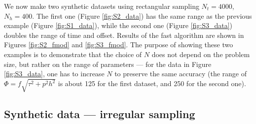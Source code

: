 We now make two synthetic datasets using rectangular sampling $N_t=4000$, $N_h=400$. The first one (Figure \ref{fig:S2_data}) has the same range as the previous example (Figure \ref{fig:S1_data}), while the second one (Figure \ref{fig:S3_data}) doubles the range of time and offset. Results of the fast algorithm are shown in Figures \ref{fig:S2_fmod} and \ref{fig:S3_fmod}. The purpose of showing these two examples is to demonstrate that the choice of $N$ does not depend on the problem size, but rather on the range of parameters --- for the data in Figure \ref{fig:S3_data}, one has to increase $N$ to preserve the same accuracy (the range of $\Phi=f\sqrt{\tau^2+p^2h^2}$ is about 125 for the first dataset, and 250 for the second one).







\subsection{Synthetic data --- irregular sampling}

